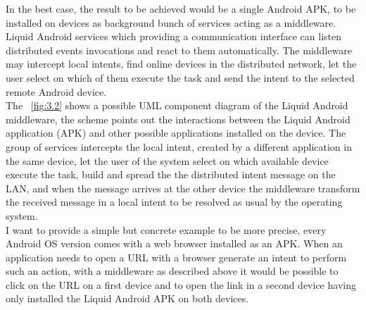 In the best case, the result to be achieved would be a single Android APK, to be installed on devices as background bunch of services acting as a middleware. Liquid Android services which providing a communication interface can listen distributed events invocations and react to them automatically. The middleware may intercept local intents, find online devices in the distributed network, let the user select on which of them execute the task and send the intent to the selected remote Android device.\\
The \figurename~\ref{fig:3.2} shows a possible UML component diagram of the Liquid Android middleware, the scheme points out the interactions between the Liquid Android application (APK) and other possible applications installed on the device. The group of services intercepts the local intent, created by a different application in the same device, let the user of the system select on which available device execute the task, build and spread the the distributed intent message on the LAN, and when the message arrives at the other device the middleware transform the received message in a local intent to be resolved as usual by the operating system.\\
I want to provide a simple but concrete example to be more precise, every Android OS version comes with a web browser installed as an APK. When an application needs to open a URL with a browser generate an intent to perform such an action, with a middleware as described above it would be possible to click on the URL on a first device and to open the link in a second device having only installed the Liquid Android APK on both devices.

